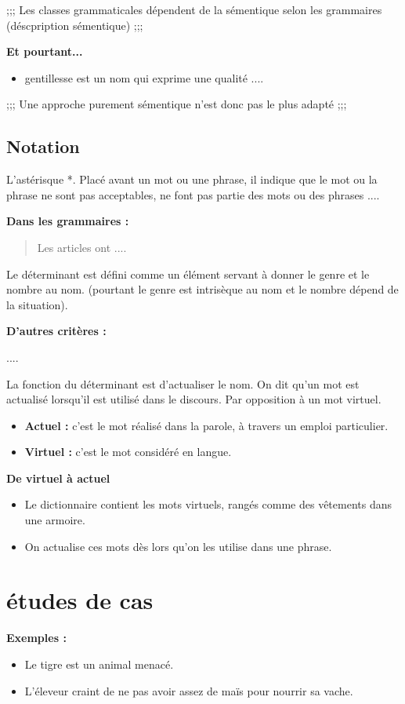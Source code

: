 ;;;
Les classes grammaticales dépendent de la sémentique selon les grammaires (déscpription sémentique)
   ;;;

\textbf{Et pourtant...}
\begin{itemize}
   \item gentillesse est un nom qui exprime une qualité
   ....

\end{itemize}
 
;;;
Une approche purement sémentique n'est donc pas le plus adapté
;;;

\subsection{Notation}
L'astérisque *.
Placé avant un mot ou une phrase, il indique que le mot ou la phrase ne sont pas acceptables, ne font pas partie des mots ou des phrases ....

\textbf{Dans les grammaires :}
\begin{quote}
   Les articles ont ....
\end{quote}

Le déterminant est défini comme un élément servant à donner le genre et le nombre au nom.
(pourtant le genre est intrisèque au nom et le nombre dépend de la situation).

\textbf{D'autres critères :}
\begin{itemize}
   ....
\end{itemize}

La fonction du déterminant est d'actualiser le nom.
On dit qu'un mot est actualisé lorsqu'il est utilisé dans le discours.
Par opposition à un mot virtuel.

\begin{itemize}
   \item \textbf{Actuel :} c'est le mot réalisé dans la parole, à travers un emploi particulier.
   \item \textbf{Virtuel :} c'est le mot considéré en langue.
\end{itemize}

\textbf{De virtuel à actuel}
\begin{itemize}
   \item Le dictionnaire contient les mots virtuels, rangés comme des vêtements dans une armoire.
   \item On actualise ces mots dès lors qu'on les utilise dans une phrase.
\end{itemize}

\section{études de cas}
\textbf{Exemples :}
\begin{itemize}
   \item Le tigre est un animal menacé.
   \item L'éleveur craint de ne pas avoir assez de maïs pour nourrir sa vache.
\end{itemize}

